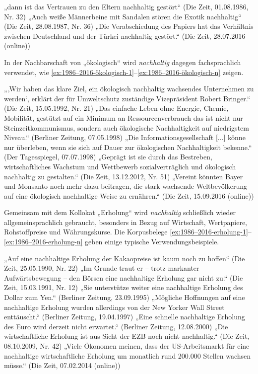\documentclass[
    german,
    a4paper,%
    12pt,%
    oneside,%
    toc=bibliography,
    final,
]{scrartcl}
\begin{document}
\begin{exe}
\ex\label{ex:1986–2016-stören-1} „dann ist das Vertrauen zu den Eltern nachhaltig gestört“ (Die Zeit, 01.08.1986, Nr. 32)
\ex „Auch weiße Männerbeine mit Sandalen stören die Exotik nachhaltig“ (Die Zeit, 28.08.1987, Nr. 36)
\ex\label{ex:1986–2016-stören-n} „Die Verabschiedung des Papiers hat das Verhältnis zwischen Deutschland und der Türkei nachhaltig gestört.“ (Die Zeit, 28.07.2016 (online))
\end{exe}

In der Nachbarschaft von „ökologisch“ wird \textit{nachhaltig} dagegen fachsprachlich verwendet, wie \ref{ex:1986–2016-ökologisch-1}–\ref{ex:1986–2016-ökologisch-n} zeigen.

\begin{exe}
\ex\label{ex:1986–2016-ökologisch-1} „‚Wir haben das klare Ziel, ein ökologisch nachhaltig wachsendes Unternehmen zu werden‘, erklärt der für Umweltschutz zuständige Vizepräsident Robert Bringer.“ (Die Zeit, 15.05.1992, Nr. 21)
\ex „Das einfache Leben ohne Energie, Chemie, Mobilität, gestützt auf ein Minimum an Ressourcenverbrauch das ist nicht nur Steinzeitkommunismus, sondern auch ökologische Nachhaltigkeit auf niedrigstem Niveau.“ (Berliner Zeitung, 07.05.1998)
\ex „Die Informationsgesellschaft [...] könne nur überleben, wenn sie sich auf Dauer zur ökologischen Nachhaltigkeit bekenne.“ (Der Tagesspiegel, 07.07.1998)
\ex „Geprägt ist sie durch das Bestreben, wirtschaftliches Wachstum und Wettbewerb sozialverträglich und ökologisch nachhaltig zu gestalten.“ (Die Zeit, 13.12.2012, Nr. 51)
\ex\label{ex:1986–2016-ökologisch-n} „Vereint könnten Bayer und Monsanto noch mehr dazu beitragen, die stark wachsende Weltbevölkerung auf eine ökologisch nachhaltige Weise zu ernähren.“ (Die Zeit, 15.09.2016 (online))
\end{exe}

Gemeinsam mit dem Kollokat „Erholung“ wird \textit{nachhaltig} schließlich wieder allgemeinsprachlich gebraucht, besonders in Bezug auf Wirtschaft, Wertpapiere, Rohstoffpreise und Währungskurse. Die Korpusbelege \ref{ex:1986–2016-erholung-1}–\ref{ex:1986–2016-erholung-n} geben einige typische Verwendungsbeispiele.

\begin{exe}
\ex\label{ex:1986–2016-erholung-1} „Auf eine nachhaltige Erholung der Kakaopreise ist kaum noch zu hoffen“ (Die Zeit, 25.05.1990, Nr. 22)
\ex „Im Grunde traut er – trotz markanter Aufwärtsbewegung – den Börsen eine nachhaltige Erholung gar nicht zu.“ (Die Zeit, 15.03.1991, Nr. 12)
\ex „Sie unterstütze weiter eine nachhaltige Erholung des Dollar zum Yen.“ (Berliner Zeitung, 23.09.1995)
\ex „Mögliche Hoffnungen auf eine nachhaltige Erholung wurden allerdings von der New Yorker Wall Street enttäuscht.“ (Berliner Zeitung, 19.04.1997)
\ex „Eine schnelle nachhaltige Erholung des Euro wird derzeit nicht erwartet.“ (Berliner Zeitung, 12.08.2000)
\ex „Die wirtschaftliche Erholung ist aus Sicht der EZB noch nicht nachhaltig.“ (Die Zeit, 08.10.2009, Nr. 42)
\ex\label{ex:1986–2016-erholung-n} „Viele Ökonomen meinen, dass der US-Arbeitsmarkt für eine nachhaltige wirtschaftliche Erholung um monatlich rund 200.000 Stellen wachsen müsse.“ (Die Zeit, 07.02.2014 (online))
\end{exe}
\end{document}
